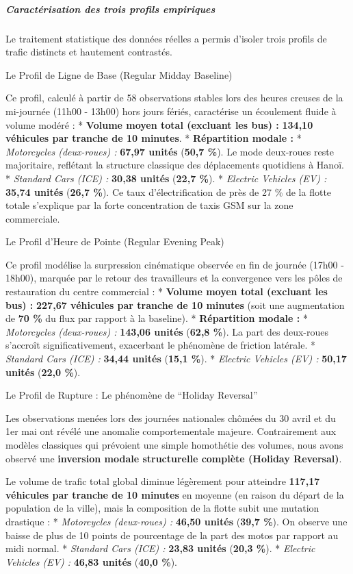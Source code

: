 \documentclass[10pt, a4paper]{article}
\begin{document}
\subparagraph{Caractérisation des trois profils
empiriques}\label{caractuxe9risation-des-trois-profils-empiriques}

Le traitement statistique des données réelles a permis d'isoler trois
profils de trafic distincts et hautement contrastés.

Le Profil de Ligne de Base (Regular Midday Baseline)

Ce profil, calculé à partir de 58 observations stables lors des heures
creuses de la mi-journée (11h00 - 13h00) hors jours fériés, caractérise
un écoulement fluide à volume modéré : * \textbf{Volume moyen total
(excluant les bus) :} \textbf{134,10 véhicules par tranche de 10
minutes}. * \textbf{Répartition modale :} * \emph{Motorcycles
(deux-roues) :} \textbf{67,97 unités} (\textbf{50,7 \%}). Le mode
deux-roues reste majoritaire, reflétant la structure classique des
déplacements quotidiens à Hanoï. * \emph{Standard Cars (ICE) :}
\textbf{30,38 unités} (\textbf{22,7 \%}). * \emph{Electric Vehicles (EV)
:} \textbf{35,74 unités} (\textbf{26,7 \%}). Ce taux d'électrification
de près de 27 \% de la flotte totale s'explique par la forte
concentration de taxis GSM sur la zone commerciale.

Le Profil d'Heure de Pointe (Regular Evening Peak)

Ce profil modélise la surpression cinématique observée en fin de journée
(17h00 - 18h00), marquée par le retour des travailleurs et la
convergence vers les pôles de restauration du centre commercial : *
\textbf{Volume moyen total (excluant les bus) :} \textbf{227,67
véhicules par tranche de 10 minutes} (soit une augmentation de
\textbf{70 \%} du flux par rapport à la baseline). * \textbf{Répartition
modale :} * \emph{Motorcycles (deux-roues) :} \textbf{143,06 unités}
(\textbf{62,8 \%}). La part des deux-roues s'accroît significativement,
exacerbant le phénomène de friction latérale. * \emph{Standard Cars
(ICE) :} \textbf{34,44 unités} (\textbf{15,1 \%}). * \emph{Electric
Vehicles (EV) :} \textbf{50,17 unités} (\textbf{22,0 \%}).

Le Profil de Rupture : Le phénomène de ``Holiday Reversal''

Les observations menées lors des journées nationales chômées du 30 avril
et du 1er mai ont révélé une anomalie comportementale majeure.
Contrairement aux modèles classiques qui prévoient une simple homothétie
des volumes, nous avons observé une \textbf{inversion modale
structurelle complète (Holiday Reversal)}.

Le volume de trafic total global diminue légèrement pour atteindre
\textbf{117,17 véhicules par tranche de 10 minutes} en moyenne (en
raison du départ de la population de la ville), mais la composition de
la flotte subit une mutation drastique : * \emph{Motorcycles
(deux-roues) :} \textbf{46,50 unités} (\textbf{39,7 \%}). On observe une
baisse de plus de 10 points de pourcentage de la part des motos par
rapport au midi normal. * \emph{Standard Cars (ICE) :} \textbf{23,83
unités} (\textbf{20,3 \%}). * \emph{Electric Vehicles (EV) :}
\textbf{46,83 unités} (\textbf{40,0 \%}).
\end{document}
